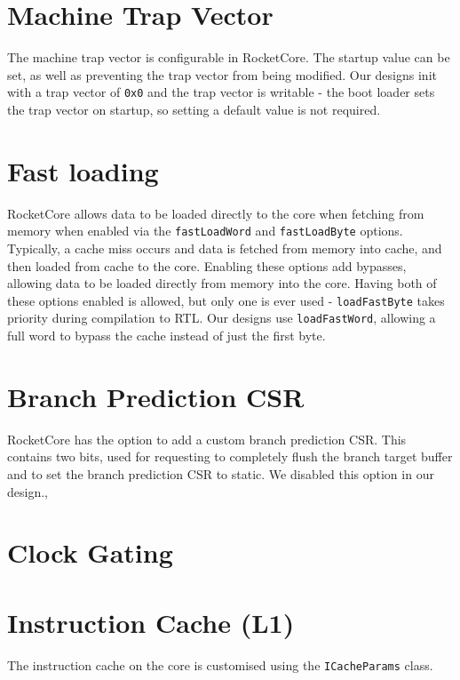 \section{Machine Trap Vector}
The machine trap vector is configurable in RocketCore. The startup value can be set, as well as preventing the trap vector from being modified. Our designs init with a trap vector of \texttt{0x0} and the trap vector is writable - the boot loader sets the trap vector on startup, so setting a default value is not required.

\section{Fast loading}
RocketCore allows data to be loaded directly to the core when fetching from memory when enabled via the \texttt{fastLoadWord} and \texttt{fastLoadByte} options. Typically, a cache miss occurs and data is fetched from memory into cache, and then loaded from cache to the core. Enabling these options add bypasses, allowing data to be loaded directly from memory into the core. Having both of these options enabled is allowed, but only one is ever used - \texttt{loadFastByte} takes priority during compilation to RTL. Our designs use \texttt{loadFastWord}, allowing a full word to bypass the cache instead of just the first byte.

\section{Branch Prediction CSR}
RocketCore has the option to add a custom branch prediction CSR. This contains two bits, used for requesting to completely flush the branch target buffer and to set the branch prediction CSR to static. We disabled this option in our design.,

\section{Clock Gating} %

\section{Instruction Cache (L1)}
The instruction cache on the core is customised using the \texttt{ICacheParams} class.

